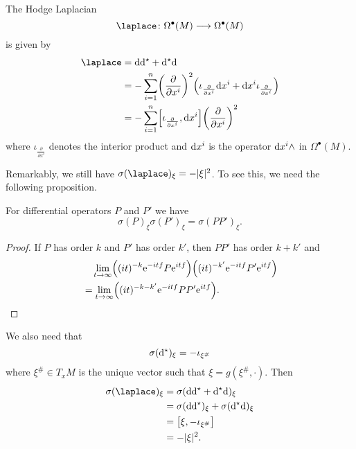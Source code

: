 \begin{example}
  The Hodge Laplacian
  \begin{equation*}
    \laplace \colon \Omega^\bullet (M) \longrightarrow \Omega^\bullet (M)
  \end{equation*}
  is given by
  \begin{align*}
    \laplace
     & = \drm \drm^\hodge + \drm^\hodge \drm                            \\
     & = - \sum_{i=1}^n \biggl( \frac{\partial}{\partial x^i} \biggr)^2
    \Bigl( \iota_{\frac{\partial}{\partial x^i}} \drm x^i
    + \drm x^i \iota_{\frac{\partial}{\partial x^i} }\Bigr)             \\
     & = - \sum_{i=1}^n
    \Bigl[ \iota_{\frac{\partial}{\partial x^i}}, \drm x^i \Bigr]
    \biggl( \frac{\partial}{\partial x^i} \biggr)^2
  \end{align*}
  where $\iota_{\frac{\partial}{\partial x^i}}$ denotes the interior product and $\mathrm{d} x^i$ is the operator $\mathrm{d} x^i \wedge$ in $\Omega^\bullet (M)$.

  Remarkably, we still have $\sigma(\laplace)_\xi = - |\xi|^2$. To see this, we need the following proposition.

  \begin{proposition}
    For differential operators $P$ and $P'$ we have
    \begin{equation*}
      \sigma(P)_\xi \sigma(P')_\xi = \sigma(P P')_\xi.
    \end{equation*}
  \end{proposition}
  \begin{proof}
    If $P$ has order $k$ and $P'$ has order $k'$, then $P P'$ has order $k + k'$ and
    \begin{align*}
       & \quad \lim_{t \to \infty}
      \Bigl( (i t)^{-k} \mathrm{e}^{-i t f} P \mathrm{e}^{i t f} \Bigr)
      \Bigl( (i t)^{-k'} \mathrm{e}^{- i t f} P' \mathrm{e}^{i t f} \Bigr) \\
       & = \lim_{t \to \infty}
      \Bigl( (i t )^{-k-k'} \mathrm{e}^{- i t f} P P' \mathrm{e}^{i t f} \Bigr).
    \end{align*}
  \end{proof}

  We also need that
  \begin{equation*}
    \sigma( \mathrm{d}^{\star})_\xi = - \iota_{\xi^\#}
  \end{equation*}
  where $\xi^\# \in T_x M$ is the unique vector such that $\xi = g(\xi^\#, \cdot)$. Then
  \begin{align*}
    \sigma(\laplace)_\xi
     & = \sigma(\drm \drm^\hodge + \drm^\hodge \drm)_\xi              \\
     & = \sigma(\drm \drm^\hodge)_\xi + \sigma (\drm^\hodge \drm)_\xi \\
     & = \bigl[\xi, - \iota_{\xi^\#}\bigr]                            \\
     & = - | \xi |^2.
  \end{align*}
\end{example}

